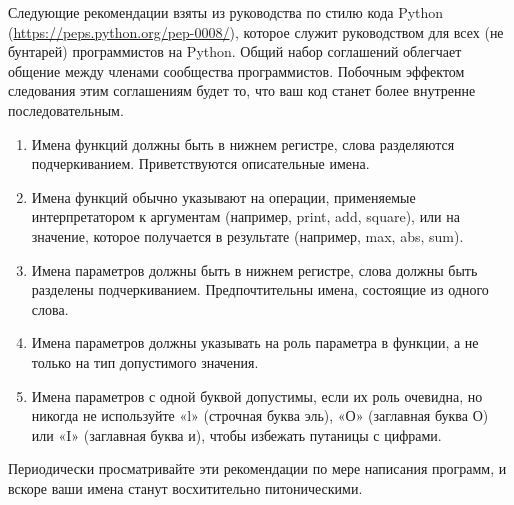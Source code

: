 Следующие рекомендации взяты из руководства по стилю кода Python (\url{https://peps.python.org/pep-0008/}), которое служит руководством для всех (не бунтарей) программистов на Python.
Общий набор соглашений облегчает общение между членами сообщества программистов.
Побочным эффектом следования этим соглашениям будет то, что ваш код станет более внутренне последовательным.
\begin{enumerate}
  \item Имена функций должны быть в нижнем регистре, слова разделяются подчеркиванием. Приветствуются описательные имена.
  \item Имена функций обычно указывают на операции, применяемые интерпретатором к аргументам (например, print, add, square), или на значение, которое получается в результате (например, max, abs, sum).
  \item Имена параметров должны быть в нижнем регистре, слова должны быть разделены подчеркиванием. Предпочтительны имена, состоящие из одного слова.
  \item Имена параметров должны указывать на роль параметра в функции, а не только на тип допустимого значения.
  \item Имена параметров с одной буквой допустимы, если их роль очевидна, но никогда не используйте «l» (строчная буква эль), «О» (заглавная буква О) или «I» (заглавная буква и), чтобы избежать путаницы с цифрами.
\end{enumerate}

Периодически просматривайте эти рекомендации по мере написания программ, и вскоре ваши имена станут восхитительно питоническими.
